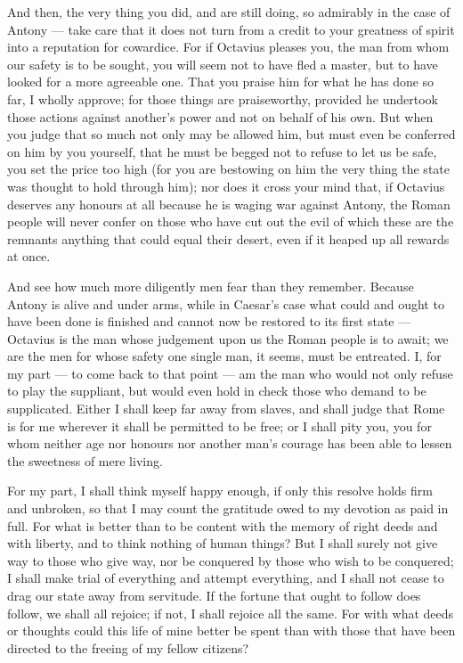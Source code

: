  And then, the very thing you did, and are still doing, so admirably in the case of Antony --- take care that it does not turn from a credit to your greatness of spirit into a reputation for cowardice. For if Octavius pleases you, the man from whom our safety is to be sought, you will seem not to have fled a master, but to have looked for a more agreeable one. That you praise him for what he has done so far, I wholly approve; for those things are praiseworthy, provided he undertook those actions against another's power and not on behalf of his own. But when you judge that so much not only may be allowed him, but must even be conferred on him by you yourself, that he must be begged not to refuse to let us be safe, you set the price too high (for you are bestowing on him the very thing the state was thought to hold through him); nor does it cross your mind that, if Octavius deserves any honours at all because he is waging war against Antony, the Roman people will never confer on those who have cut out the evil of which these are the remnants anything that could equal their desert, even if it heaped up all rewards at once.

 And see how much more diligently men fear than they remember. Because Antony is alive and under arms, while in Caesar's case what could and ought to have been done is finished and cannot now be restored to its first state --- Octavius is the man whose judgement upon us the Roman people is to await; we are the men for whose safety one single man, it seems, must be entreated. I, for my part --- to come back to that point --- am the man who would not only refuse to play the suppliant, but would even hold in check those who demand to be supplicated. Either I shall keep far away from slaves, and shall judge that Rome is for me wherever it shall be permitted to be free; or I shall pity you, you for whom neither age nor honours nor another man's courage has been able to lessen the sweetness of mere living.

 For my part, I shall think myself happy enough, if only this resolve holds firm and unbroken, so that I may count the gratitude owed to my devotion as paid in full. For what is better than to be content with the memory of right deeds and with liberty, and to think nothing of human things? But I shall surely not give way to those who give way, nor be conquered by those who wish to be conquered; I shall make trial of everything and attempt everything, and I shall not cease to drag our state away from servitude. If the fortune that ought to follow does follow, we shall all rejoice; if not, I shall rejoice all the same. For with what deeds or thoughts could this life of mine better be spent than with those that have been directed to the freeing of my fellow citizens?

